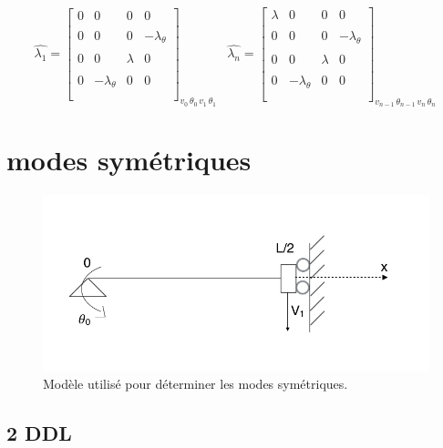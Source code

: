 \documentclass[a4paper,10pt]{report} %
\begin{document}
\[ \widehat{\lambda_1}=\left[ \begin{array}{cccc}
0 &0& 0&0     \\\\
0&0&0&-\lambda_{\theta} \\\\
0&0& \lambda&0    \\\\
0&-\lambda_{\theta}&0&0   \\\\
 \end{array} \right]_{v_0 \, \theta_0 \, v_1 \, \theta_1 \, }
 \,\,\,\,
  \widehat{\lambda_n}=\left[ \begin{array}{cccc}
\lambda &0& 0&0     \\\\
0&0&0&-\lambda_{\theta} \\\\
0&0& \lambda&0    \\\\
0&-\lambda_{\theta}&0&0   \\\\
 \end{array} \right]_{v_{n-1} \, \theta_{n-1} \, v_{n} \, \theta_{n} \, }\]
 




\section{modes symétriques}


\begin{figure}[H]
\begin{center}
	\includegraphics[width=1\textwidth]{SchemaModeSym.png} 
\end{center} 
\caption{Modèle utilisé pour déterminer les modes symétriques.}
\end{figure}

\subsection{2 DDL}
\end{document}
